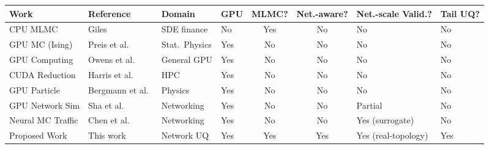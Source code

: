 \documentclass[pdflatex,sn-mathphys-num]{sn-jnl}
\theoremstyle{thmstyleone}%
\theoremstyle{thmstyletwo}%
\theoremstyle{thmstylethree}%
\begin{document}
\begin{table}
\label{tab:gpu_lit}
\begin{tabular}{llllccll}
\toprule
Work & Reference & Domain & GPU & MLMC? & Net.-aware? &
Net.-scale Valid.? & Tail UQ? \\
\midrule
CPU MLMC & Giles \cite{giles2008multilevel} & SDE finance & No & Yes & No & No & No \\
GPU MC (Ising) & Preis et al.\ \cite{thompson2010gpu} & Stat.\ Physics & Yes & No & No & No & No \\
GPU Computing & Owens et al.\ \cite{owens2008} & General GPU & Yes & No & No & No & No \\
CUDA Reduction & Harris et al.\ \cite{harris2007} & HPC & Yes & No & No & No & No \\
GPU Particle & Bergmann et al.\ \cite{bergmann2017gpu} & Physics & Yes & No & No & No & No \\
GPU Network Sim & Sha et al.\ \cite{sha2023gpu} & Networking & Yes & No & No & Partial & No \\
Neural MC Traffic & Chen et al.\ \cite{chen2022neural} & Networking & Yes & No & No &
Yes (surrogate) & No \\
Proposed Work & This work & Network UQ & Yes & Yes & Yes & Yes (real-topology) & Yes \\
\bottomrule
\end{tabular}


\end{table}
\end{document}
